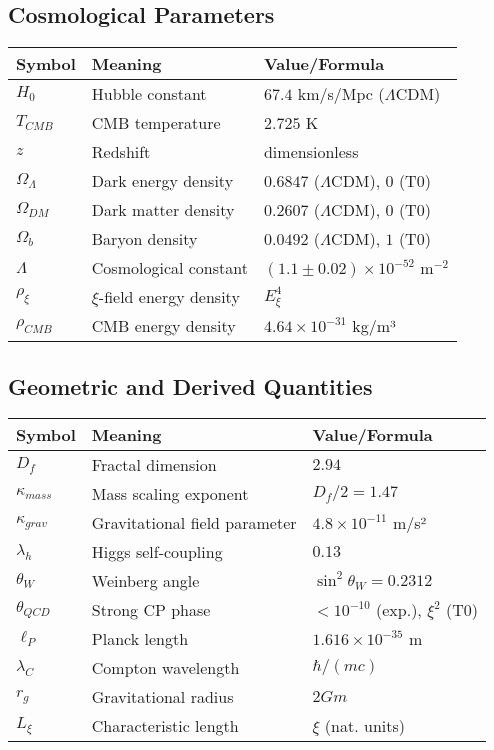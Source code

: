 \documentclass[12pt,a4paper]{article}
\begin{document}
\subsection{Cosmological Parameters}
\begin{longtable}{lll}
	\toprule
	\textbf{Symbol} & \textbf{Meaning} & \textbf{Value/Formula} \\
	\midrule
	$H_0$ & Hubble constant & $67.4$ km/s/Mpc ($\Lambda$CDM) \\
	$T_{CMB}$ & CMB temperature & $2.725$ K \\
	$z$ & Redshift & dimensionless \\
	$\Omega_\Lambda$ & Dark energy density & $0.6847$ ($\Lambda$CDM), $0$ (T0) \\
	$\Omega_{DM}$ & Dark matter density & $0.2607$ ($\Lambda$CDM), $0$ (T0) \\
	$\Omega_b$ & Baryon density & $0.0492$ ($\Lambda$CDM), $1$ (T0) \\
	$\Lambda$ & Cosmological constant & $(1.1 \pm 0.02) \times 10^{-52}$ m$^{-2}$ \\
	$\rho_\xi$ & $\xi$-field energy density & $E_\xi^4$ \\
	$\rho_{CMB}$ & CMB energy density & $4.64 \times 10^{-31}$ kg/m³ \\
	\bottomrule
\end{longtable}

\subsection{Geometric and Derived Quantities}
\begin{longtable}{lll}
	\toprule
	\textbf{Symbol} & \textbf{Meaning} & \textbf{Value/Formula} \\
	\midrule
	$D_f$ & Fractal dimension & $2.94$ \\
	$\kappa_{mass}$ & Mass scaling exponent & $D_f/2 = 1.47$ \\
	$\kappa_{grav}$ & Gravitational field parameter & $4.8 \times 10^{-11}$ m/s² \\
	$\lambda_h$ & Higgs self-coupling & $0.13$ \\
	$\theta_W$ & Weinberg angle & $\sin^2\theta_W = 0.2312$ \\
	$\theta_{QCD}$ & Strong CP phase & $< 10^{-10}$ (exp.), $\xi^2$ (T0) \\
	$\ell_P$ & Planck length & $1.616 \times 10^{-35}$ m \\
	$\lambda_C$ & Compton wavelength & $\hbar/(mc)$ \\
	$r_g$ & Gravitational radius & $2Gm$ \\
	$L_\xi$ & Characteristic length & $\xi$ (nat. units) \\
	\bottomrule
\end{longtable}
\end{document}

